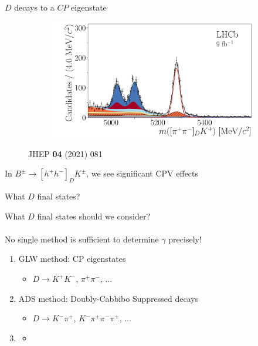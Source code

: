 \documentclass[dvipsnames]{beamer}
\begin{document}
\begin{frame}{$D$ decays to a $C\!P$ eigenstate}
\begin{figure}
\begin{subfigure}{0.45\textwidth}
    \end{subfigure}%
    \begin{subfigure}{0.45\textwidth}
      \includegraphics[width = 1.0\textwidth]{Plots/B2DK_D2pipi_Plus.pdf}
    \end{subfigure}
    \caption*{\tiny JHEP \textbf{04} (2021) 081}
  \end{figure}
  \vspace{-0.5cm}
  \begin{center}
    \Large In $B^\pm\to[h^+h^-]_DK^\pm$, we see significant CPV effects
  \end{center}
\end{frame}

\begin{frame}{What $D$ final states?}
  \begin{center}
    \Large What $D$ final states should we consider?\\~\\
    \Large No single method is sufficient to determine $\gamma$ precisely!
  \end{center}
  \vspace{0.2cm}
  \begin{enumerate}
    \setlength\itemsep{1.0em}
    \item{GLW method: CP eigenstates}
    \begin{itemize}
      \item{$D\to K^+K^-$, $\pi^+\pi^-$, ...}
    \end{itemize}
    \item{ADS method: Doubly-Cabbibo Suppressed decays}
    \begin{itemize}
      \item{$D\to K^-\pi^+$, $K^-\pi^+\pi^-\pi^+$, ...}
    \end{itemize}
    \item{\phantom{BPGGSZ method: Multi-body final states}}
    \begin{itemize}
      \item[]{\phantom{$D\to K_S^0\pi^+\pi^-$, $K_S^0K^+K^-$, ...}}
    \end{itemize}
  \end{enumerate}
\end{frame}
\end{document}
